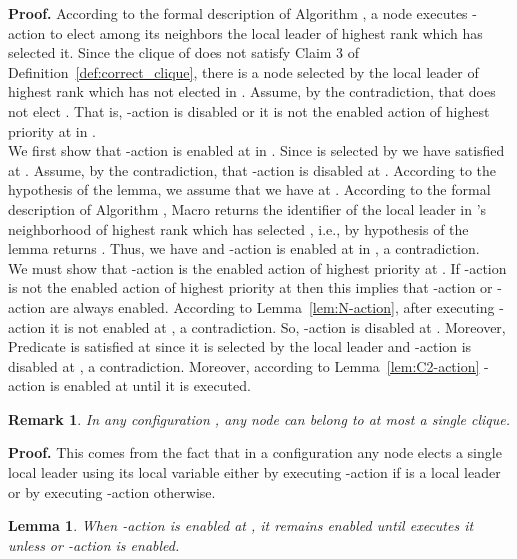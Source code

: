 \documentclass[11pt,letterpaper,onecolumn]{article}
\newtheorem{lemma}{Lemma}
\newenvironment{proof}{\noindent \begin{rm}{\textbf{Proof.} }}{\hspace*{\fill}\par\end{rm} \vspace{.3cm}}
\newtheorem{rem}{Remark}
\begin{document}
\begin{proof}
According to the formal description of Algorithm , a node executes -action to elect among its neighbors the local leader of highest rank which has selected it. Since the clique  of  does not satisfy Claim 3 of Definition~\ref{def:correct_clique}, there is a node  selected by the local leader  of highest rank which has not elected  in . Assume, by the contradiction, that  does not elect . That is, -action is disabled or it is not the enabled action of highest priority at  in .\\
We first show that -action is enabled at  in . Since  is selected by  we have  satisfied at . Assume, by the contradiction, that -action is disabled at . According to the hypothesis of the lemma, we assume that we have  at . According to the formal description of Algorithm , Macro  returns the identifier of the local leader in 's neighborhood of highest rank which has selected , i.e., by hypothesis of the lemma  returns . Thus, we have  and -action is enabled at  in , a contradiction.\\
We must show that -action is the enabled action of highest priority at . If -action is not the enabled action of highest priority at  then this implies that -action or -action are always enabled. According to Lemma~\ref{lem:N-action}, after executing -action it is not enabled at , a contradiction. So, -action is disabled at . Moreover, Predicate  is satisfied at  since it is selected by the local leader  and -action is disabled at , a contradiction. Moreover, according to Lemma~\ref{lem:C2-action} -action is enabled at  until it is executed.
\end{proof}

\begin{rem}
\label{rem:elect_clique}
In any configuration , any node  can belong to at most a single clique.
\end{rem}

\begin{proof}
This comes from the fact that in a configuration  any node  elects a single local leader using its local variable  either by executing -action if  is a local leader or by executing -action otherwise.
\end{proof}

\begin{lemma}
\label{lem:C3-action}
When -action is enabled at , it remains enabled until  executes it unless  or -action is enabled.
\end{lemma}
\end{document}
